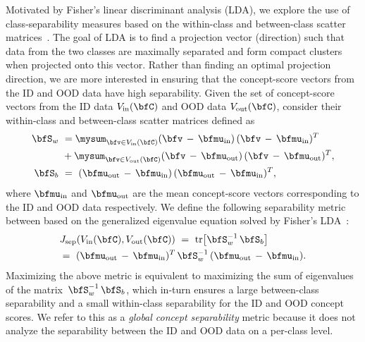 Motivated by Fisher's linear discriminant analysis (LDA), we explore the use of class-separability measures based on the within-class and between-class scatter matrices~\cite{murphy2012separ}.
The goal of LDA is to find a projection vector (direction) such that data from the two classes are maximally separated and form compact clusters when projected onto this vector. 
Rather than finding an optimal projection direction, we are more interested in ensuring that the concept-score vectors from the ID and OOD data have high separability.
Given the set of concept-score vectors from the ID data $V_{\textrm{in}}(\bfC)$ and OOD data $V_{\textrm{out}}(\bfC)$, consider their within-class and between-class scatter matrices defined as
\begin{align}
\label{eq:scatter_matrices}
\bfS_w ~&= \mysum_{\bfv \in V_{\textrm{in}}(\bfC)} (\bfv \,-\, \bfmu_{\textrm{in}})\,(\bfv \,-\, \bfmu_{\textrm{in}})^T \nonumber \\
&+ \mysum_{\bfv \in V_{\textrm{out}}(\bfC)} (\bfv \,-\, \bfmu_{\textrm{out}})\,(\bfv \,-\, \bfmu_{\textrm{out}})^T, \\
%
\bfS_b ~&=~ (\bfmu_{\textrm{out}} \,-\, \bfmu_{\textrm{in}})\,(\bfmu_{\textrm{out}} \,-\, \bfmu_{\textrm{in}})^T,
\end{align}
where $\bfmu_{\textrm{in}}$ and $\bfmu_{\textrm{out}}$ are the mean concept-score vectors corresponding to the ID and OOD data respectively.
We define the following separability metric between based on the generalized eigenvalue equation solved by Fisher's LDA~\cite{fukunaga1990separ, murphy2012separ}:
\begin{align}
\label{eq:separability_trace}
&J_{\textrm{sep}}(V_{\textrm{in}}(\bfC), V_{\textrm{out}}(\bfC)) ~=~ \textrm{tr}\big[\bfS_w^{-1} \,\bfS_b\big] \nonumber \\
&=~ (\bfmu_{\textrm{out}} \,-\, \bfmu_{\textrm{in}})^T \,\bfS_w^{-1} \,(\bfmu_{\textrm{out}} \,-\, \bfmu_{\textrm{in}}).
\end{align}
Maximizing the above metric is equivalent to maximizing the sum of eigenvalues of the matrix $\,\bfS_w^{-1} \,\bfS_b$, which in-turn ensures a large between-class separability and a small within-class separability for the ID and OOD concept scores.
We refer to this as a {\em global concept separability} metric because it does not analyze the separability between the ID and OOD data on a per-class level.

